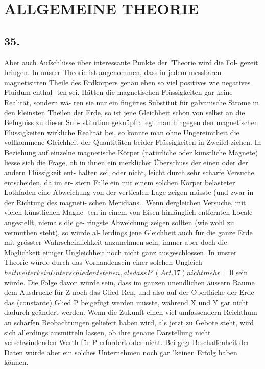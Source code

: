 \documentclass[12pt,a4paper]{article}
\begin{document}
\newpage


\section*{ALLGEMEINE THEORIE}

\subsection*{35.}
Aber auch Aufschlüsse über interessante Punkte der 'Theorie wird die Fol- gezeit bringen. In unsrer Theorie ist angenommen, dass in jedem messbaren magnetisirten Theile des Erdkörpers genäu eben so viel positives wie negatives Fluidum enthal- ten sei. Hätten die magnetischen Flüssigkeiten gar keine Realität, sondern wä- ren sie nur ein fingirtes Substitut für galvanische Ströme in den kleinsten Theilen der Erde, so ist jene Gleichheit schon von selbst an die Befugniss zu dieser Sub- stitution geknüpft: legt man hingegen den magnetischen Flüssigkeiten wirkliche Realität bei, so könnte man ohne Ungereimtheit die vollkommene Gleichheit der Quantitäten beider Flüssigkeiten in Zweifel ziehen. In Beziehung auf einzelne magnetische Körper (natürliche oder künstliche Magnete) liesse sich die Frage, ob in ihnen ein merklicher Überschuss der einen oder der andern Flüssigkeit ent- halten sei, oder nicht, leicht durch sehr scharfe Versuche entscheiden, da im er- stern Falle ein mit einem solchen Körper belasteter Lothfaden eine Abweichung von der verticalen Lage zeigen müsste (und zwar in der Richtung des magneti- schen Meridians.. Wenn dergleichen Versuche, mit vielen künstlichen Magne- ten in einem von Eisen hinlänglich entfernten Locale angestellt, niemals die ge- ringste Abweichung zeigen sollten (wie wohl zu vermuthen steht), so würde al- lerdings jene Gleichheit auch für die ganze Erde mit grösster Wahrscheinlichkeit anzunehmen sein, immer aber doch die Möglichkeit einiger Ungleichheit noch nicht ganz ausgeschlossen. In unsrer Theorie würde durch das Vorhandensein einer solchen Ungleich-
$heit weiter kein Unterschied entstehen, als dass P^\circ (Art. 17) nicht mehr = 0$
sein würde. Die Folge davon würde sein, dass im ganzen unendlichen äussern Raume dem Ausdrucke für Z noch das Glied Ren, und also auf der Oberfläche der Erde das (constante) Glied P\textdegree{} beigefügt werden müsste, während X und Y gar nicht dadurch geändert werden. Wenn die Zukunft einen viel umfassendern Reichthum an scharfen Beobachtungen geliefert haben wird, als jetzt zu Gebote steht, wird sich allerdings ausmitteln lassen, ob ihre genaue Darstellung nicht verschwindenden Werth für P\textdegree{} erfordert oder nicht. Bei geg\i{} Beschaffenheit der Daten würde aber ein solches Unternehmen noch gar "keinen Erfolg haben können.
\end{document}
